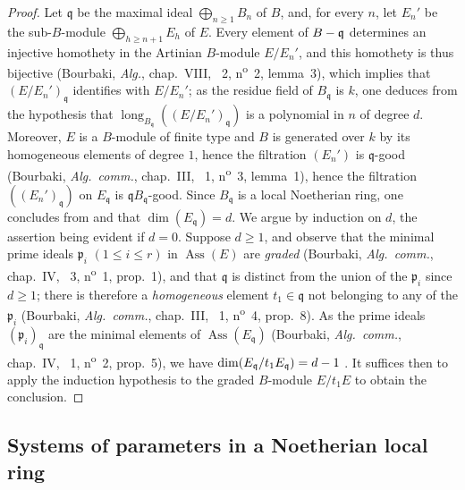 \begin{proof}
Let $\mathfrak{q}$ be the maximal ideal $\bigoplus_{n\geq 1}B_n$ of $B$, and, for every $n$, let $E_n'$ be the sub-$B$-module $\bigoplus_{h\geq n+1}E_h$ of $E$.
Every element of $B-\mathfrak{q}$ determines an injective homothety in the Artinian $B$-module $E/E_n'$, and this homothety is thus bijective (Bourbaki, \emph{Alg.}, chap.~VIII, \textsection~2, n\textsuperscript{o}~2, lemma~3), which implies that $(E/E_n')_\mathfrak{q}$ identifies with $E/E_n'$; as the residue field of $B_\mathfrak{q}$ is $k$, one deduces from the hypothesis that $\operatorname{long}_{B_\mathfrak{q}}((E/E_n')_\mathfrak{q})$ is a polynomial in $n$ of degree $d$. Moreover, $E$ is a $B$-module of finite type and $B$ is generated over $k$ by its homogeneous elements of degree $1$, hence the filtration $(E_n')$ is $\mathfrak{q}$-good (Bourbaki, \emph{Alg.~comm.}, chap.~III, \textsection~1, n\textsuperscript{o}~3, lemma~1), hence the filtration $((E_n')_\mathfrak{q})$ on $E_\mathfrak{q}$ is $\mathfrak{q}B_\mathfrak{q}$-good.
Since $B_\mathfrak{q}$ is a local Noetherian ring, one concludes from  and  that $\dim(E_\mathfrak{q})=d$. We argue by induction on $d$, the assertion being evident if $d=0$.
Suppose $d\geq 1$, and observe that the minimal prime ideals $\mathfrak{p}_i$ $(1\leq i\leq r)$ in $\operatorname{Ass}(E)$ are \emph{graded} (Bourbaki, \emph{Alg.~comm.}, chap.~IV, \textsection~3, n\textsuperscript{o}~1, prop.~1), and that $\mathfrak{q}$ is distinct from the union of the $\mathfrak{p}_i$ since $d\geq 1$; there is therefore a \emph{homogeneous} element $t_1\in\mathfrak{q}$ not belonging to any of the $\mathfrak{p}_i$ (Bourbaki, \emph{Alg.~comm.}, chap.~III, \textsection~1, n\textsuperscript{o}~4, prop.~8).
As the prime ideals $(\mathfrak{p}_i)_\mathfrak{q}$ are the minimal elements of $\operatorname{Ass}(E_\mathfrak{q})$ (Bourbaki, \emph{Alg.~comm.}, chap.~IV, \textsection~1, n\textsuperscript{o}~2, prop.~5), we have $\dim(E_\mathfrak{q}/t_1E_\mathfrak{q})=d- 1$ .
It suffices then to apply the induction hypothesis to the graded $B$-module $E/t_1E$ to obtain the conclusion.
\end{proof}

\subsection{Systems of parameters in a Noetherian local ring}
\label{subsection:0.16.3}

